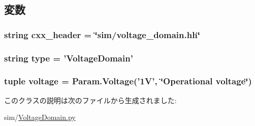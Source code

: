 \subsection{変数}
\hypertarget{classVoltageDomain_1_1VoltageDomain_a17da7064bc5c518791f0c891eff05fda}{
\subsubsection[{cxx\_\-header}]{\setlength{\rightskip}{0pt plus 5cm}string {\bf cxx\_\-header} = \char`\"{}sim/voltage\_\-domain.hh\char`\"{}}}
\label{classVoltageDomain_1_1VoltageDomain_a17da7064bc5c518791f0c891eff05fda}
\hypertarget{classVoltageDomain_1_1VoltageDomain_acce15679d830831b0bbe8ebc2a60b2ca}{
\subsubsection[{type}]{\setlength{\rightskip}{0pt plus 5cm}string {\bf type} = '{\bf VoltageDomain}'}}
\label{classVoltageDomain_1_1VoltageDomain_acce15679d830831b0bbe8ebc2a60b2ca}
\hypertarget{classVoltageDomain_1_1VoltageDomain_a129c12be8ba4068175594eb00cc0114e}{
\subsubsection[{voltage}]{\setlength{\rightskip}{0pt plus 5cm}tuple {\bf voltage} = Param.Voltage('1V', \char`\"{}Operational voltage\char`\"{})}}
\label{classVoltageDomain_1_1VoltageDomain_a129c12be8ba4068175594eb00cc0114e}


このクラスの説明は次のファイルから生成されました:\begin{DoxyCompactItemize}
\item 
sim/\hyperlink{VoltageDomain_8py}{VoltageDomain.py}\end{DoxyCompactItemize}
